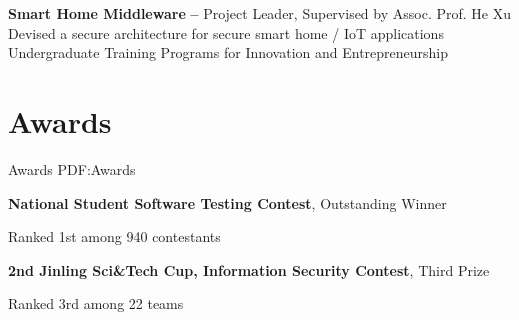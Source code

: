 \documentclass[a4paper,MMMyyyy,nonstop]{simpleresumecv}
\begin{document}
\begin{body}
\textbf{Smart Home Middleware}
\hfill \textbf{  --  }
\SubItem
Project Leader, Supervised by Assoc. Prof. He Xu
\SubItem
Devised a secure architecture for secure smart home / IoT applications
\SubItem
Undergraduate Training Programs for Innovation and Entrepreneurship







\section
{Awards}
{Awards}
{PDF:Awards}

\textbf{National Student Software Testing Contest}, Outstanding Winner
\hfill
\textbf{  }

\SubItem
Ranked 1st among 940 contestants

\GapNoBreak

\textbf{2nd Jinling Sci\&Tech Cup, Information Security Contest}, Third Prize
\hfill
\textbf{  }
\begin{detail}
\SubItem
Ranked 3rd among 22 teams
\end{detail}


\end{body}
\end{document}
